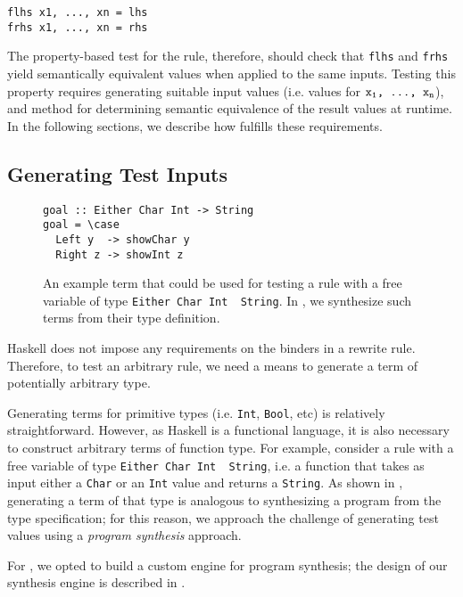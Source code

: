 \begin{verbatim}
flhs x1, ..., xn = lhs
frhs x1, ..., xn = rhs
\end{verbatim}

The property-based test for the rule, therefore, should check that \texttt{flhs}
and \texttt{frhs} yield semantically equivalent values when applied to the same
inputs. Testing this property requires generating suitable input values (i.e.
values for $\texttt{x\textsubscript{1}, \ldots, x\textsubscript{n}}$), and method for determining semantic equivalence of the
result values at runtime. In the following sections, we describe how \Rulecheck
fulfills these requirements.

\subsection{Generating Test Inputs}\label{sec:methodology:testinput}

\begin{figure}
  \begin{verbatim}
goal :: Either Char Int -> String
goal = \case
  Left y  -> showChar y
  Right z -> showInt z
  \end{verbatim}
  \caption{An example term that could be used for testing a rule with a free
variable of type \mbox{\texttt{Either Char Int \textrightarrow~String}}. In \Rulecheck, we
synthesize such terms from their type definition.}
  \label{fig:methodology:synthexample}
\end{figure}

Haskell does not impose any requirements on the binders \rbinders in a rewrite
rule. Therefore, to test an arbitrary rule, we need a means to generate a term
of potentially arbitrary type.

Generating terms for primitive types (i.e. \texttt{Int}, \texttt{Bool}, etc) is
relatively straightforward. However, as Haskell is a functional language, it is
also necessary to construct arbitrary terms of function type. For example,
consider a rule with a free variable of type \mbox{\texttt{Either Char Int \textrightarrow~String}},
i.e. a function that takes as input either a \texttt{Char} or an \texttt{Int}
value and returns a \texttt{String}. As shown in
, generating a term of that type is analogous
to synthesizing a program from the type specification; for this reason, we
approach the challenge of generating test values using a \textit{program
synthesis} approach.

For \Rulecheck, we opted to build a custom engine for program synthesis; the
design of our synthesis engine is described in .

